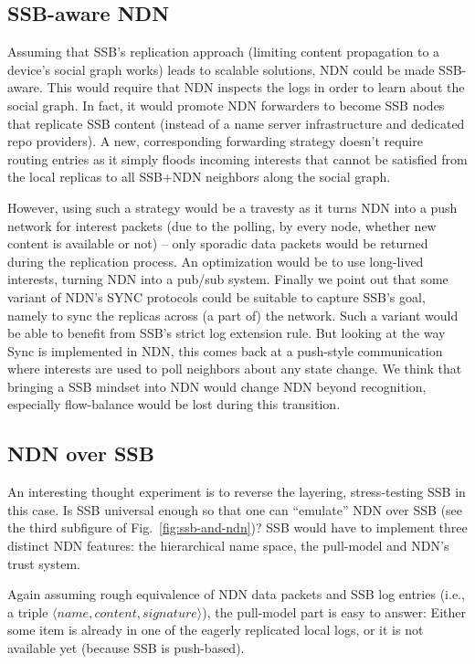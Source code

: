 \documentclass[10pt,sigconf,rewiew]{acmart}
\begin{document}
\subsection{SSB-aware NDN}

Assuming that SSB's replication approach (limiting content propagation
to a device's social graph works) leads to scalable solutions, NDN
could be made SSB-aware. This would require that NDN inspects the logs
in order to learn about the social graph. In fact, it would promote
NDN forwarders to become SSB nodes that replicate SSB content (instead
of a name server infrastructure and dedicated repo providers). A new,
corresponding forwarding strategy doesn't require routing entries as
it simply floods incoming interests that cannot be satisfied from the
local replicas to all SSB+NDN neighbors along the social graph.

However, using such a strategy would be a travesty as it turns NDN
into a push network for interest packets (due to the polling, by every
node, whether new content is available or not) -- only sporadic data
packets would be returned during the replication process. An
optimization would be to use long-lived interests, turning NDN into a
pub/sub system. Finally we point out that some variant of NDN's SYNC
protocols could be suitable to capture SSB's goal, namely to sync the
replicas across (a part of) the network. Such a variant would be able
to benefit from SSB's strict log extension rule. But looking at the
way Sync is implemented in NDN, this comes back at a push-style
communication where interests are used to poll neighbors about any
state change. We think that bringing a SSB mindset into NDN would
change NDN beyond recognition, especially flow-balance would be
lost during this transition.

\subsection{NDN over SSB}
\label{ssect:ndn-over-ssb}

An interesting thought experiment is to reverse the layering,
stress-testing SSB in this case. Is SSB universal enough so that one
can ``emulate'' NDN over SSB (see the third subfigure of
Fig.~\ref{fig:ssb-and-ndn})? SSB would have to implement three
distinct NDN features: the hierarchical name space, the pull-model
and NDN's trust system.

Again assuming rough equivalence of NDN data packets and SSB log
entries (i.e., a triple $\langle name,content,signature\rangle$), the
pull-model part is easy to answer: Either some item is already in one
of the eagerly replicated local logs, or it is not available yet
(because SSB is push-based).
\end{document}
